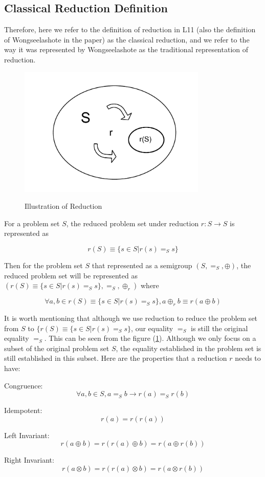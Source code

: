 \documentclass[a4paper,12pt,twoside,openright]{report}
\newcommand{\e}[2]{
\begin{equation}
  \label{#1} 
  #2
\end{equation}
}
\begin{document}
\subsection{Classical Reduction Definition}
Therefore, here we refer to the definition of reduction in L11 (also the definition of Wongseelashote in the paper) as the classical reduction, and we refer to the way it was represented by Wongseelashote as the traditional representation of reduction.
\begin{figure}[H]
\centering
\includegraphics[width=0.8\textwidth]{reduction.pdf}
\label{reduction}
\caption{Illustration of Reduction}
\end{figure}
For a problem set $S$, the reduced problem set under reduction $r: S \rightarrow S$ is represented as 
\e{r:def:traditional}{r(S) \equiv \{s \in S | r(s) =_S s\}}
Then for the problem set $S$ that represented as a semigroup $(S,=_S,\oplus)$, the reduced problem set will be represented as $({r(S) \equiv \{s \in S | r(s) =_S s\}},=_S,\oplus_r)$ where 
\e{r:def:binary_operator}{\forall a, b \in r(S) \equiv \{s \in S | r(s) =_S s\}, a \oplus_r b \equiv r(a \oplus b)}
It is worth mentioning that although we use reduction to reduce the problem set from $S$ to $\{r(S) \equiv \{s \in S | r(s) =_S s\}$, our equality $=_S$ is still the original equality $=_S$. 
This can be seen from the figure (\ref{reduction}). Although we only focus on a subset of the original problem set $S$, the equality established in the problem set is still established in this subset. 
Here are the properties that a reduction $r$ needs to have:

Congruence: \e{r:def:congruence}{\forall a,b \in S, a =_S b \rightarrow r(a) =_S r(b)}
Idempotent: \e{r:def:idempotent}{r(a) = r(r(a))} 
Left Invariant: \e{r:def:left_invariant}{r(a\oplus b) = r(r(a)\oplus b) = r(a\oplus r(b))}
Right Invariant: \e{r:def:right_invariant}{r(a\otimes b) = r(r(a)\otimes b) = r(a\otimes r(b))}
\end{document}
